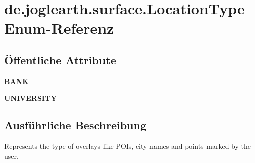 \section{de.\-joglearth.\-surface.\-Location\-Type Enum-\/\-Referenz}
\label{enumde_1_1joglearth_1_1surface_1_1_location_type}
\subsection*{Öffentliche Attribute}
\begin{DoxyCompactItemize}
\item 
{\bfseries B\-A\-N\-K}\label{enumde_1_1joglearth_1_1surface_1_1_location_type_a64d4431c5b47f2b9144cd6f9668688d9}

\item 
{\bfseries U\-N\-I\-V\-E\-R\-S\-I\-T\-Y}\label{enumde_1_1joglearth_1_1surface_1_1_location_type_a453624a346d676c1ee1132f2cbca283d}

\end{DoxyCompactItemize}


\subsection{Ausführliche Beschreibung}
Represents the type of overlays like P\-O\-Is, city names and points marked by the user. 
